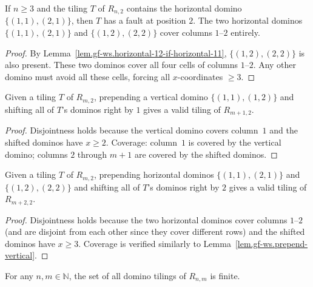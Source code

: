 \begin{lemma}
\label{lem.gf-ws.fault-at-2-if-horizontal}
\leanhelper
\leanok
If $n \ge 3$ and the tiling $T$ of $R_{n,2}$ contains the horizontal domino
$\{(1,1),(2,1)\}$, then $T$ has a fault at position $2$. The two horizontal
dominos $\{(1,1),(2,1)\}$ and $\{(1,2),(2,2)\}$ cover columns $1$--$2$
entirely.
\end{lemma}

\begin{proof}
By Lemma~\ref{lem.gf-ws.horizontal-12-if-horizontal-11}, $\{(1,2),(2,2)\}$
is also present. These two dominos cover all four cells of columns $1$--$2$.
Any other domino must avoid all these cells, forcing all $x$-coordinates $\ge 3$.
\end{proof}

\begin{lemma}
\label{lem.gf-ws.prepend-vertical}
\leanhelper
\leanok
Given a tiling $T$ of $R_{m,2}$, prepending a vertical domino $\{(1,1),(1,2)\}$
and shifting all of $T$'s dominos right by $1$ gives a valid tiling of
$R_{m+1,2}$.
\end{lemma}

\begin{proof}
\leanok
Disjointness holds because the vertical domino covers column~$1$ and the
shifted dominos have $x \ge 2$. Coverage: column~$1$ is covered by the
vertical domino; columns $2$ through $m+1$ are covered by the shifted
dominos.
\end{proof}

\begin{lemma}
\label{lem.gf-ws.prepend-horizontal-pair}
\leanhelper
\leanok
Given a tiling $T$ of $R_{m,2}$, prepending horizontal dominos
$\{(1,1),(2,1)\}$ and $\{(1,2),(2,2)\}$ and shifting all of $T$'s dominos
right by $2$ gives a valid tiling of $R_{m+2,2}$.
\end{lemma}

\begin{proof}
\leanok
Disjointness holds because the two horizontal dominos cover columns $1$--$2$
(and are disjoint from each other since they cover different rows) and the
shifted dominos have $x \ge 3$. Coverage is verified similarly to
Lemma~\ref{lem.gf-ws.prepend-vertical}.
\end{proof}

\begin{lemma}
\label{lem.gf-ws.tilings-finite}
\leanhelper
\leanok
For any $n, m \in \mathbb{N}$, the set of all domino tilings of $R_{n,m}$ is finite.
\end{lemma}

